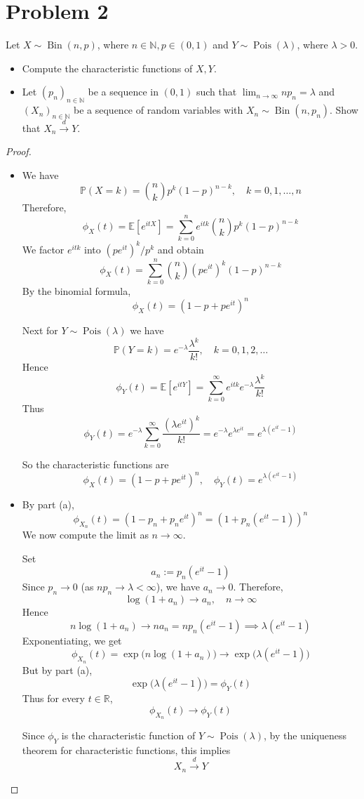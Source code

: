 \section*{Problem 2}
Let $X \sim \operatorname{Bin}(n, p)$, 
where $n \in \mathbb{N}, p \in(0,1)$ and
$Y \sim \operatorname{Pois}(\lambda)$, 
where $\lambda>0$.
\begin{itemize}
\item[(a)] Compute the characteristic functions of $X, Y$.
\item[(b)] 
Let $\left(p_n\right)_{n \in \mathbb{N}}$ be a sequence in $(0,1)$
such that $\lim _{n \rightarrow \infty} n p_n=\lambda$ 
and $\left(X_n\right)_{n \in \mathbb{N}}$ be a sequence of random variables 
 with $X_n \sim \operatorname{Bin}\left(n, p_n\right)$. 
Show that $X_n \xrightarrow{d} Y$.
\end{itemize}
\begin{proof}
\begin{itemize}
\item[(a)]
We have
\[
\mathbb{P}(X=k)=\binom{n}{k}p^k(1-p)^{n-k}, \quad k=0,1,\dots,n
\]
Therefore,
\[
\phi_X(t)
=
\mathbb{E}[e^{itX}]
=
\sum_{k=0}^n e^{itk}\binom{n}{k}p^k(1-p)^{n-k}
\]
We factor $e^{itk}$ into $(pe^{it})^k/p^k$ and obtain
\[
\phi_X(t)
=
\sum_{k=0}^n \binom{n}{k}(pe^{it})^k(1-p)^{n-k}
\]
By the binomial formula,
\[
\phi_X(t)=(1-p+pe^{it})^n
\]

Next for $Y \sim \operatorname{Pois}(\lambda)$ we have
\[
\mathbb{P}(Y=k)=e^{-\lambda}\frac{\lambda^k}{k!}, \quad k=0,1,2,\dots
\]
Hence
\[
\phi_Y(t)
=
\mathbb{E}[e^{itY}]
=
\sum_{k=0}^{\infty} e^{itk} e^{-\lambda}\frac{\lambda^k}{k!}
\]
Thus
\[
\phi_Y(t)
=
e^{-\lambda}\sum_{k=0}^{\infty}\frac{(\lambda e^{it})^k}{k!}
=
e^{-\lambda}e^{\lambda e^{it}}
=
e^{\lambda(e^{it}-1)}
\]

So the characteristic functions are
\[
\phi_X(t)=(1-p+pe^{it})^n,
\quad
\phi_Y(t)=e^{\lambda(e^{it}-1)}
\]

\item[(b)]
By part (a),
\[
\phi_{X_n}(t)=(1-p_n+p_ne^{it})^n
=
\left(1+p_n(e^{it}-1)\right)^n
\]
We now compute the limit as $n \to \infty$.

Set
\[
a_n:=p_n(e^{it}-1)
\]
Since $p_n \to 0$ (as $np_n \to \lambda < \infty$), 
we have $a_n \to 0$. Therefore,
\[
\log(1+a_n)\to a_n,
\quad n\to\infty
\]
Hence
\[
n\log(1+a_n)\to  na_n
=
np_n(e^{it}-1)
\implies
\lambda(e^{it}-1)
\]
Exponentiating, we get
\[
\phi_{X_n}(t)
=
\exp\bigl(n\log(1+a_n)\bigr)
\longrightarrow
\exp\bigl(\lambda(e^{it}-1)\bigr)
\]
But by part (a),
\[
\exp\bigl(\lambda(e^{it}-1)\bigr)=\phi_Y(t)
\]
Thus for every $t \in \mathbb{R}$,
\[
\phi_{X_n}(t)\longrightarrow \phi_Y(t)
\]

Since $\phi_Y$ is the characteristic function 
of $Y \sim \operatorname{Pois}(\lambda)$, by the uniqueness theorem
for characteristic functions, this implies
\[
X_n \xrightarrow{d} Y
\]
\end{itemize}
\end{proof}



